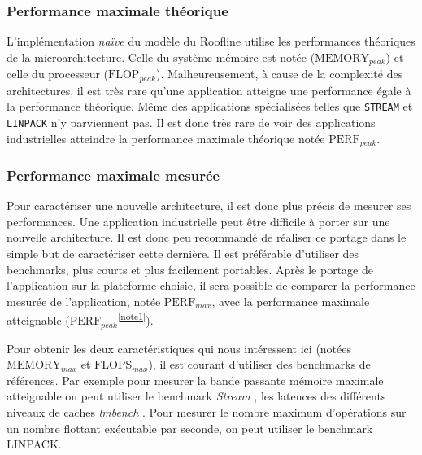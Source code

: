    \subsubsection{Performance maximale théorique}
        
        L'implémentation \textit{naïve}\cite{Williams2008a} du modèle du Roofline utilise les performances théoriques de la microarchitecture. Celle du système mémoire est notée ($\text{MEMORY}_{peak}$) et celle du processeur ($\text{FLOP}_{peak}$). Malheureusement, à cause de la complexité des architectures, il est très rare qu'une application atteigne une performance égale à la performance théorique. Même des applications spécialisées telles que \verb=STREAM= et \verb=LINPACK= n'y parviennent pas. Il est donc très rare de voir des applications industrielles atteindre la performance maximale théorique notée $\text{PERF}_{peak}$.
    
        
    \subsubsection{Performance maximale mesurée}
    
        Pour caractériser une nouvelle architecture, il est donc plus précis de mesurer ses performances. Une application industrielle peut être difficile à porter sur une nouvelle architecture. Il est donc peu recommandé de réaliser ce portage dans le simple but de caractériser cette dernière. Il est préférable d'utiliser des benchmarks, plus courts et plus facilement portables. Après le portage de l'application sur la plateforme choisie, il sera possible de comparer la performance mesurée de l'application, notée $\text{PERF}_{max}$\protect\footnotemark, avec la performance maximale atteignable ($\text{PERF}_{peak}$\textsuperscript{\ref{note1}}).

    
        Pour obtenir les deux caractéristiques qui nous intéressent ici (notées $\text{MEMORY}_{max}$ et $\text{FLOPS}_{max}$), il est courant d'utiliser des benchmarks de références. Par exemple pour mesurer la bande passante mémoire maximale atteignable on peut utiliser le benchmark \textit{Stream} \cite{McCalpin1995}, les latences des différents niveaux de caches \textit{lmbench} \cite{Staelin2002}. Pour mesurer le nombre maximum d'opérations sur un nombre flottant exécutable par seconde, on peut utiliser le benchmark LINPACK.
        
